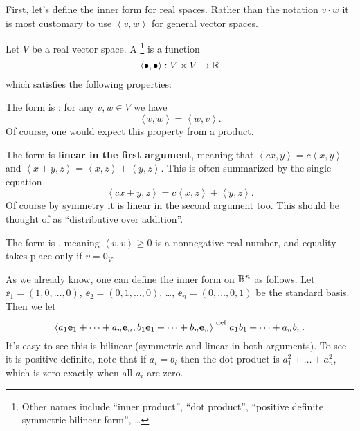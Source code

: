 First, let's define the inner form for real spaces.
Rather than the notation $v \cdot w$ it is most customary
to use $\left< v,w \right>$ for general vector spaces.
\begin{definition}
	Let $V$ be a real vector space.
	A \footnote{%
	Other names include ``inner product'', ``dot product'', ``positive definite symmetric bilinear form'', \dots}
	is a function
	\[ \left< \bullet, \bullet \right> : V \times V \to \mathbb R \]
	which satisfies the following properties:
	\begin{itemize}
			\ii The form is : for any $v,w \in V$ we have
		\[ \left< v,w \right> = \left< w,v\right>. \]
		Of course, one would expect this property from a product.

		\ii The form is \textbf{linear in the first argument}, meaning that
		$\left< cx, y\right> = c \left< x,y \right>$ and
		$\left< x+y, z\right> = \left< x,z\right> + \left< y,z\right>$.
		This is often summarized by the single equation
		\[ \left< cx+y, z \right> = c \left< x,z \right> + \left< y,z \right>. \]
		Of course by symmetry it is linear in the second argument too.
		This should be thought of as ``distributive over addition''.

		\ii The form is , meaning $\left<v,v\right> \ge 0$
		is a nonnegative real number, and equality takes place only if $v = 0_V$.
	\end{itemize}
\end{definition}

\begin{example}
	[$\RR^n$]
	As we already know, one can define the inner form on $\RR^n$ as follows.
	Let $\ee_1 = (1, 0, \dots, 0)$, $\ee_2 = (0, 1, \dots, 0)$, \dots, $\ee_n = (0, \dots, 0, 1)$
	be the standard basis.
	Then we let
	\[ 
		\left< a_1 \mathbf e_1 + \dots + a_n \mathbf e_n, b_1 \mathbf e_1 + \dots + b_n \mathbf e_n \right>
		\overset{\mathrm{def}}{=} a_1b_1 + \dots + a_nb_n.
	\]
	It's easy to see this is bilinear (symmetric and linear in both arguments).
	To see it is positive definite, note that if $a_i = b_i$
	then the dot product is $a_1^2 + \dots + a_n^2$, which is zero exactly when all $a_i$ are zero.
\end{example}


